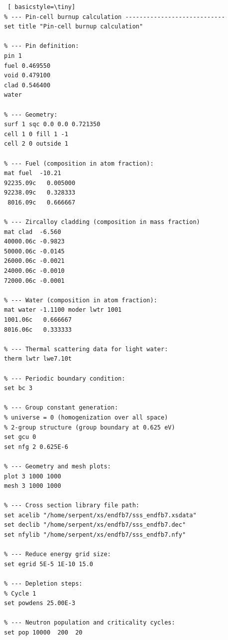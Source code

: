 \documentclass[14pt,a4paper]{article} %
\begin{document}
\begin{lstlisting} [ basicstyle=\tiny]
% --- Pin-cell burnup calculation ----------------------------
set title "Pin-cell burnup calculation"

% --- Pin definition:
pin 1
fuel 0.469550
void 0.479100
clad 0.546400
water

% --- Geometry:
surf 1 sqc 0.0 0.0 0.721350
cell 1 0 fill 1 -1
cell 2 0 outside 1

% --- Fuel (composition in atom fraction):
mat fuel  -10.21
92235.09c   0.005000
92238.09c   0.328333
 8016.09c   0.666667

% --- Zircalloy cladding (composition in mass fraction)
mat clad  -6.560
40000.06c -0.9823
50000.06c -0.0145
26000.06c -0.0021
24000.06c -0.0010
72000.06c -0.0001

% --- Water (composition in atom fraction):
mat water -1.1100 moder lwtr 1001
1001.06c   0.666667
8016.06c   0.333333

% --- Thermal scattering data for light water:
therm lwtr lwe7.10t

% --- Periodic boundary condition:
set bc 3

% --- Group constant generation:
% universe = 0 (homogenization over all space)
% 2-group structure (group boundary at 0.625 eV)
set gcu 0
set nfg 2 0.625E-6

% --- Geometry and mesh plots:
plot 3 1000 1000
mesh 3 1000 1000

% --- Cross section library file path:
set acelib "/home/serpent/xs/endfb7/sss_endfb7.xsdata"
set declib "/home/serpent/xs/endfb7/sss_endfb7.dec"
set nfylib "/home/serpent/xs/endfb7/sss_endfb7.nfy"

% --- Reduce energy grid size:
set egrid 5E-5 1E-10 15.0

% --- Depletion steps:
% Cycle 1
set powdens 25.00E-3

% --- Neutron population and criticality cycles:
set pop 10000  200  20

\end{lstlisting}
\end{document}
